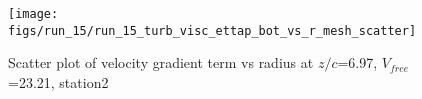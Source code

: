 \begin{figure}[H]
\centering
\texttt{[image: figs/run\_15/run\_15\_turb\_visc\_ettap\_bot\_vs\_r\_mesh\_scatter]}
\caption{Scatter plot of velocity gradient term vs radius at $z/c$=6.97, $V_{free}$=23.21, station2}
\label{fig:run_15_turb_visc_ettap_bot_vs_r_mesh_scatter}
\end{figure}


